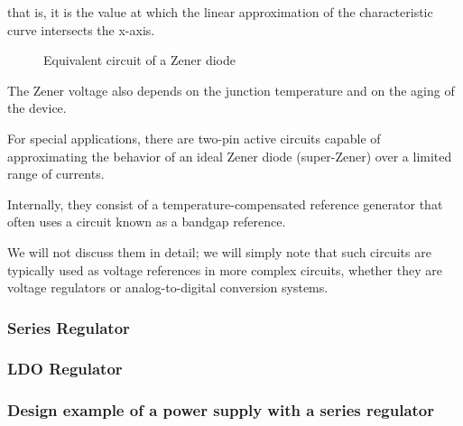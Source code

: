 \documentclass[../main.tex]{subfiles}
\begin{document}
that is, it is the value at which the linear approximation of the characteristic curve intersects the x-axis.


\begin{figure}[h!]
\begin{center}


\label{zenerss}
\caption{Equivalent circuit of a Zener diode}	
\end{center}	
\end{figure} 


The Zener voltage also depends on the junction temperature and on the aging of the device.


For special applications, there are two-pin active circuits capable of approximating the behavior of an ideal Zener diode (super-Zener) over a limited range of currents. 

Internally, they consist of a temperature-compensated reference generator that often uses a circuit known as a bandgap reference. 

We will not discuss them in detail; we will simply note that such circuits are typically used as voltage references in more complex circuits, whether they are voltage regulators or analog-to-digital conversion systems.









\subsubsection{Series Regulator}
\subsubsection{LDO Regulator}
\subsubsection{Design example of a power supply with a series regulator}
\end{document}
